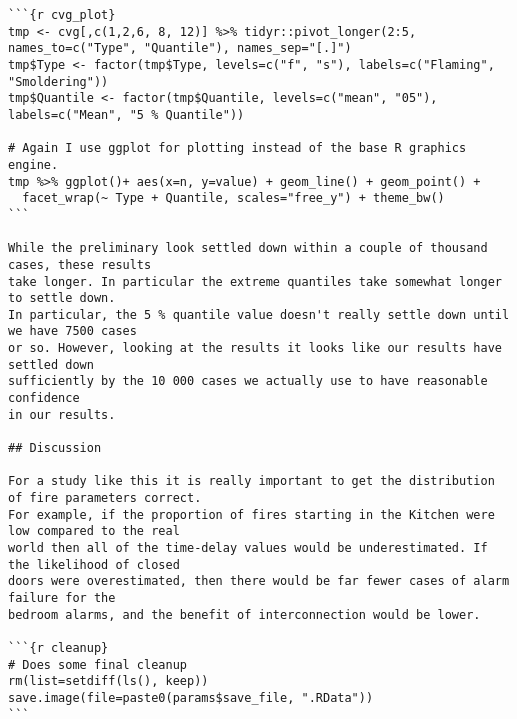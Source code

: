 \begin{lstlisting}[basicstyle=\scriptsize]
```{r cvg_plot}
tmp <- cvg[,c(1,2,6, 8, 12)] %>% tidyr::pivot_longer(2:5, names_to=c("Type", "Quantile"), names_sep="[.]")
tmp$Type <- factor(tmp$Type, levels=c("f", "s"), labels=c("Flaming", "Smoldering"))
tmp$Quantile <- factor(tmp$Quantile, levels=c("mean", "05"), labels=c("Mean", "5 % Quantile"))

# Again I use ggplot for plotting instead of the base R graphics engine.
tmp %>% ggplot()+ aes(x=n, y=value) + geom_line() + geom_point() +
  facet_wrap(~ Type + Quantile, scales="free_y") + theme_bw()
```

While the preliminary look settled down within a couple of thousand cases, these results
take longer. In particular the extreme quantiles take somewhat longer to settle down.
In particular, the 5 % quantile value doesn't really settle down until we have 7500 cases
or so. However, looking at the results it looks like our results have settled down
sufficiently by the 10 000 cases we actually use to have reasonable confidence
in our results.

## Discussion

For a study like this it is really important to get the distribution of fire parameters correct.
For example, if the proportion of fires starting in the Kitchen were low compared to the real
world then all of the time-delay values would be underestimated. If the likelihood of closed
doors were overestimated, then there would be far fewer cases of alarm failure for the
bedroom alarms, and the benefit of interconnection would be lower.

```{r cleanup}
# Does some final cleanup
rm(list=setdiff(ls(), keep))
save.image(file=paste0(params$save_file, ".RData"))
```

\end{lstlisting} 